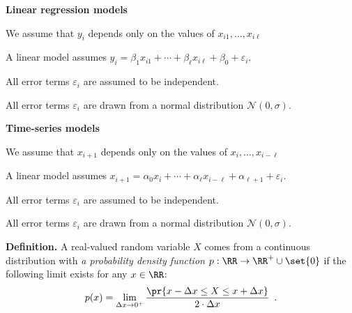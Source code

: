 \documentclass[landscape,footrule]{foils}
\begin{document}
\titlefoil




\textbf{Linear regression models}
\begin{triangles}
\item We assume that $y_i$ depends only on the values of $x_{i1}, \ldots, x_{i\ell}$ 
\item A linear model assumes $y_{i}=\beta_{1}x_{i1}+\cdots+ \beta_\ell x_{i\ell}+ \beta_{0}+\varepsilon_i$.
\item All error terms $\varepsilon_i$ are assumed to be independent.
\item  All error terms $\varepsilon_i$ are drawn from a normal distribution $\mathcal{N}(0,\sigma)$.
\end{triangles}





\textbf{Time-series models}
\begin{triangles}
\item We assume that $x_{i+1}$ depends only on the values of $x_i, \ldots, x_{i-\ell}$ 
\item A linear model assumes $x_{i+1}=\alpha_{0}x_i+\cdots+ \alpha_\ell x_{i-\ell}+ \alpha_{\ell+1}+\varepsilon_i$.
\item All error terms $\varepsilon_i$ are assumed to be independent.
\item  All error terms $\varepsilon_i$ are drawn from a normal distribution $\mathcal{N}(0,\sigma)$.
\end{triangles}






\textbf{Definition.}
A real-valued random variable $X$ comes from a continuous distribution with \emph{a probability density function} $p:\RR\to\RR^+\cup\set{0}$ if the following limit exists for any $x\in\RR$:
\begin{align*}
p(x)=\lim_{\Delta x \to 0^+} \frac{\pr{x -\Delta x \leq X\leq x+\Delta x}}{2\cdot \Delta x}\enspace.
\end{align*} 
\end{document}

